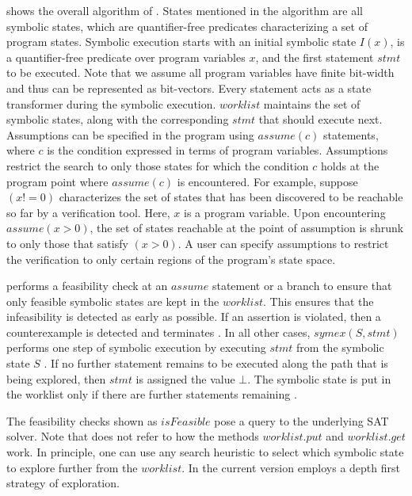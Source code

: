  shows the overall algorithm of \verifox. States mentioned
in the algorithm are all symbolic states, which are quantifier-free predicates characterizing
a set of program states. 
Symbolic execution starts with an initial symbolic state $I(x)$, is a quantifier-free predicate
over program variables $x$, and the first statement $\mathit{stmt}$ to be executed.  Note that we assume all program variables
have finite bit-width and thus can be represented as bit-vectors.
Every statement acts as a state transformer during the symbolic execution. $\mathit{worklist}$ 
maintains the set of symbolic states, along with the corresponding
$\mathit{stmt}$ that should execute next. Assumptions can be specified in the program 
using $\mathit{assume}(c)$ statements, where $c$ is the condition expressed in terms 
of program variables. Assumptions restrict the search to only those
states for which the condition $c$ holds at the program point where $\mathit{assume}(c)$ is encountered.
For example, suppose $(x!=0)$ characterizes the set of states that has been discovered to be
reachable so far by a verification tool. Here, $x$ is a program variable.
Upon encountering $\mathit{assume}(x>0)$, the 
set of states reachable at the point of assumption is shrunk to only those that
satisfy $(x>0)$. A user can specify assumptions to restrict
the verification to only certain regions of the program's state space.

\verifox performs a feasibility check at an $\mathit{assume}$ statement 
or a branch  to ensure that
only feasible symbolic states are kept in the $\mathit{worklist}$. This ensures that the
infeasibility is detected as early as possible. 
If an assertion is violated, then a counterexample is detected and 
terminates . In all other cases, $\mathit{symex}(S,\mathit{stmt})$ performs
one step of symbolic execution by executing $\mathit{stmt}$ from the symbolic state $S$ .
If no further statement remains to be executed along the path that is being explored,
then $\mathit{stmt}$ is assigned the value $\bot$. The symbolic state is put in the worklist only 
if there are further statements remaining .

The feasibility checks shown as $\mathit{isFeasible}$ pose a query to the underlying SAT solver.
Note that  does not refer to how the methods $\mathit{worklist.put}$ and $\mathit{worklist.get}$
work. In principle, one can use any search heuristic to select which symbolic state to explore 
further from the $\mathit{worklist}$. In the current version \verifox employs a depth first strategy of exploration.

